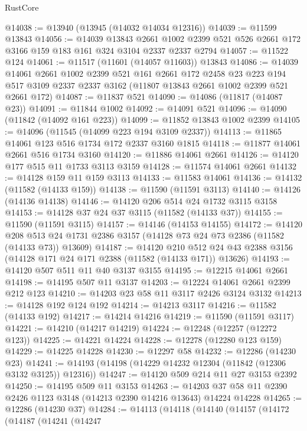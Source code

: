 \begin{lexlean}{RustCore}
\begin{coremodule}
@14038 := @13940 (@13945 (@14032 @14034 @12316))
@14039 := @11599 @13843
@14056 := @14039
    @13843
    @2661
    @1002
    @2399
    @521
    @526
    @2661
    @172
    @3166
    @159
    @183
    @161
    @324
    @3104
    @2337
    @2337
    @2794
@14057 := @11522 @124
@14061 := @11517 (@11601 (@14057 @11603)) @13843
@14086 := @14039
    @14061
    @2661
    @1002
    @2399
    @521
    @161
    @2661
    @172
    @2458
    @23
    @223
    @194
    @517
    @3109
    @2337
    @2337
    @3162
    (@11807 @13843 @2661 @1002 @2399 @521 @2661 @172)
@14087 := @11837 @521
@14090 := @14086 (@11817 (@14087 @23))
@14091 := @11844 @1002
@14092 := @14091 @521
@14096 := @14090 (@11842 (@14092 @161 @223))
@14099 := @11852 @13843 @1002 @2399
@14105 := @14096 (@11545 (@14099 @223 @194 @3109 @2337))
@14113 := @11865 @14061 @123 @516 @1734 @172 @2337 @3160 @1815
@14118 := @11877 @14061 @2661 @516 @1734 @3160
@14120 := @11886 @14061 @2661
@14126 := @14120 @177 @515 @11 @1733 @3113 @3159
@14128 := @11574 @14061 @2661
@14132 := @14128 @159 @11 @159 @3113
@14133 := @11583 @14061
@14136 := @14132 (@11582 (@14133 @159))
@14138 := @11590 (@11591 @3113)
@14140 := @14126 (@14136 @14138)
@14146 := @14120 @206 @514 @24 @1732 @3115 @3158
@14153 := @14128 @37 @24 @37 @3115 (@11582 (@14133 @37))
@14155 := @11590 (@11591 @3115)
@14157 := @14146 (@14153 @14155)
@14172 := @14120
    @208
    @513
    @24
    @1731
    @2386
    @3157
    (@14128 @73 @24 @73 @2386 (@11582 (@14133 @73)) @13609)
@14187 := @14120
    @210
    @512
    @24
    @43
    @2388
    @3156
    (@14128 @171 @24 @171 @2388 (@11582 (@14133 @171)) @13626)
@14193 := @14120 @507 @511 @11 @40 @3137 @3155
@14195 := @12215 @14061 @2661
@14198 := @14195 @507 @11 @3137
@14203 := @12224 @14061 @2661 @2399 @212 @123
@14210 := @14203 @23 @58 @11 @3117 @2426 @3124 @3132
@14213 := @14128 @192 @124 @192
@14214 := @14213 @3117
@14216 := @11582 (@14133 @192)
@14217 := @14214 @14216
@14219 := @11590 (@11591 @3117)
@14221 := @14210 (@14217 @14219)
@14224 := @12248 (@12257 (@12272 @123))
@14225 := @14221 @14224
@14228 := @12278 (@12280 @123 @159)
@14229 := @14225 @14228
@14230 := @12297 @58
@14232 := @12286 (@14230 @23)
@14241 := @14193 (@14198 (@14229 @14232 @12304 (@11842 (@12306 @3132 @3125)) @12316))
@14247 := @14120 @509 @214 @11 @27 @3153 @2392
@14250 := @14195 @509 @11 @3153
@14263 := @14203 @37 @58 @11 @2390 @2426 @1123 @3148 (@14213 @2390 @14216 @13643) @14224 @14228
@14265 := @12286 (@14230 @37)
@14284 := @14113
    (@14118
      (@14140
        (@14157
          (@14172
            (@14187
              (@14241
                (@14247

\end{coremodule}
\end{lexlean}
